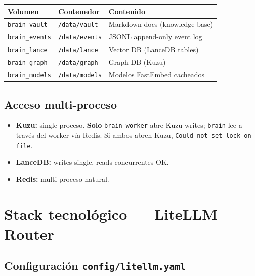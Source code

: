\documentclass[11pt,a4paper]{article}
\begin{document}
\begin{center}
\begin{tabular}{|l|l|l|}
\hline
\rowcolor{hermesblue}\color{white}\textbf{Volumen} & \color{white}\textbf{Contenedor} & \color{white}\textbf{Contenido}\\
\hline
\texttt{brain\_vault} & \texttt{/data/vault} & Markdown docs (knowledge base)\\
\texttt{brain\_events} & \texttt{/data/events} & JSONL append-only event log\\
\texttt{brain\_lance} & \texttt{/data/lance} & Vector DB (LanceDB tables)\\
\texttt{brain\_graph} & \texttt{/data/graph} & Graph DB (Kuzu)\\
\texttt{brain\_models} & \texttt{/data/models} & Modelos FastEmbed cacheados\\
\hline
\end{tabular}
\end{center}

\subsection{Acceso multi-proceso}

\begin{itemize}[leftmargin=*,itemsep=1pt]
\item \textbf{Kuzu:} single-proceso. \textbf{Solo} \texttt{brain-worker} abre Kuzu writes; \texttt{brain} lee a través del worker vía Redis. Si ambos abren Kuzu, \texttt{Could not set lock on file}.
\item \textbf{LanceDB:} writes single, reads concurrentes OK.
\item \textbf{Redis:} multi-proceso natural.
\end{itemize}

\newpage

\section{Stack tecnológico — LiteLLM Router}

\subsection{Configuración \texttt{config/litellm.yaml}}
\end{document}
